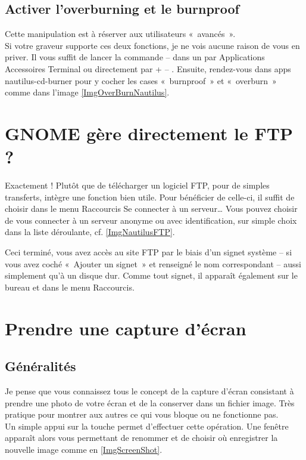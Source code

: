 \subsection{Activer l'overburning et le burnproof}
Cette manipulation est à réserver aux utilisateurs «~avancés~».\\
Si votre graveur supporte ces deux fonctions, je ne vois aucune raison de vous en priver. Il vous suffit de lancer la commande -- dans un  par Applications \FlecheDroite Accessoires \FlecheDroite Terminal ou directement par  +  -- . Ensuite, rendez-vous dans apps \FlecheDroite nautilus-cd-burner pour y cocher les cases «~burnproof~» et «~overburn~» comme dans l'image \ref{ImgOverBurnNautilus}.
\section{GNOME gère directement le FTP ?}
Exactement ! Plutôt que de télécharger un logiciel FTP, pour de simples transferts,  intègre une fonction bien utile. Pour bénéficier de celle-ci, il suffit de choisir dans le menu Raccourcis \FlecheDroite Se connecter à un serveur\ldots{} Vous pouvez choisir de vous connecter à un serveur anonyme ou avec identification, sur simple choix dans la liste déroulante, cf. \ref{ImgNautilusFTP}.\par
{}
Ceci terminé, vous avez accès au site FTP par le biais d'un signet système -- si vous avez coché «~Ajouter un signet~» et renseigné le nom correspondant -- aussi simplement qu'à un disque dur. Comme tout signet, il apparaît également sur le bureau et dans le menu Raccourcis.
\section{Prendre une capture d'écran}
\subsection{Généralités}
Je pense que vous connaissez tous le concept de la capture d'écran consistant à prendre une photo de votre écran et de la conserver dans un fichier image. Très pratique pour montrer aux autres ce qui vous bloque ou ne fonctionne pas.\\
Un simple appui sur la touche  permet d'effectuer cette opération. Une fenêtre apparaît alors vous permettant de renommer et de choisir où enregistrer la nouvelle image comme en \ref{ImgScreenShot}.\par
{}
